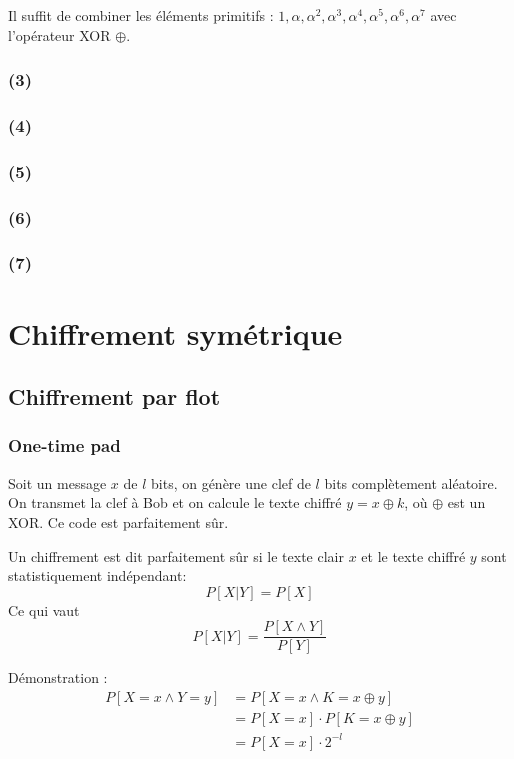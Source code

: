 \documentclass[11pt,a4paper]{report}
\begin{document}
Il suffit de combiner les éléments primitifs : ${1,\alpha,\alpha^2,\alpha^3,\alpha^4,\alpha^5,\alpha^6,\alpha^7}$ avec l'opérateur XOR $\oplus$.

\subsection*{(3)}

\subsection*{(4)}

\subsection*{(5)}

\subsection*{(6)}

\subsection*{(7)}

\chapter{Chiffrement symétrique}

\section{Chiffrement par flot}

\subsection{One-time pad}

Soit un message $x$ de $l$ bits, on génère une clef de $l$ bits complètement aléatoire. On transmet la clef à Bob et on calcule le texte chiffré $y=x\oplus k$, où $\oplus$ est un XOR. Ce code est parfaitement sûr.

Un chiffrement est dit parfaitement sûr si le texte clair $x$ et le texte chiffré $y$ sont statistiquement indépendant:
$$ P[X|Y] = P[X] $$
Ce qui vaut
$$ P[X|Y] = \frac{P[X \wedge Y]}{P[Y]} $$

Démonstration :
\begin{align*}
P[X = x \wedge Y = y] &= P[X=x \wedge K = x \oplus y] \\
                      &= P[X=x] \cdot P[K=x \oplus y] \\
                      &= P[X=x] \cdot 2^{-l}
\end{align*}
\end{document}
